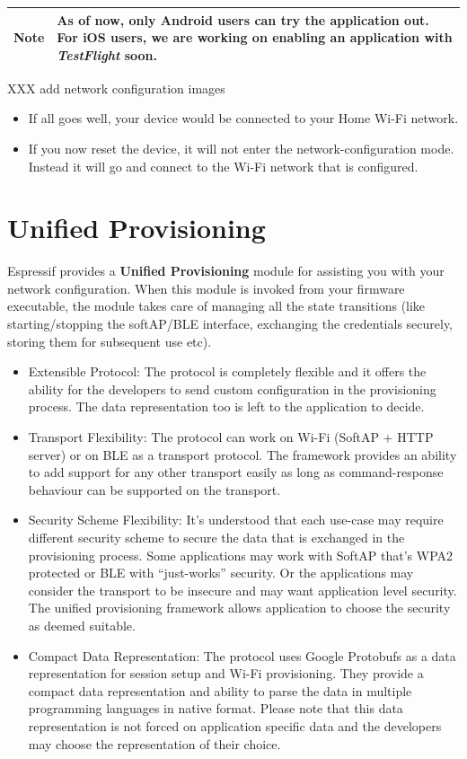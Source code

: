 \documentclass[11pt,fleqn]{book} %
\newcommand{\ksnotebox}[1]{\begin{tabularx}{\textwidth}{ |c|X| }
\hline
\cellcolor{lightgray} \textbf{Note} & #1 \\
\hline
\end{tabularx}} %
\begin{document}
\ksnotebox{As of now, only Android users can try the application out. For iOS users, we are working on enabling an application with \textit{TestFlight} soon.}

XXX add network configuration images

\begin{itemize}
    \item If all goes well, your device would be connected to your Home Wi-Fi network.
    \item If you now reset the device, it will not enter the network-configuration mode. Instead it will go and connect to the Wi-Fi network that is configured.
\end{itemize}

 
\section{Unified Provisioning}

Espressif provides a \textbf{Unified Provisioning} module for assisting you with your network configuration. When this module is invoked from your firmware executable, the module takes care of managing all the state transitions (like starting/stopping the softAP/BLE interface, exchanging the credentials securely, storing them for subsequent use etc).

\begin{itemize}

\item Extensible Protocol: The protocol is completely flexible and it offers the ability for the developers to send custom configuration in the provisioning process. The data representation too is left to the application to decide.
\item Transport Flexibility: The protocol can work on Wi-Fi (SoftAP + HTTP server) or on BLE as a transport protocol. The framework provides an ability to add support for any other transport easily as long as command-response behaviour can be supported on the transport.
\item Security Scheme Flexibility: It’s understood that each use-case may require different security scheme to secure the data that is exchanged in the provisioning process. Some applications may work with SoftAP that’s WPA2 protected or BLE with “just-works” security. Or the applications may consider the transport to be insecure and may want application level security. The unified provisioning framework allows application to choose the security as deemed suitable.
\item Compact Data Representation: The protocol uses Google Protobufs as a data representation for session setup and Wi-Fi provisioning. They provide a compact data representation and ability to parse the data in multiple programming languages in native format. Please note that this data representation is not forced on application specific data and the developers may choose the representation of their choice.

\end{itemize}
\end{document}
